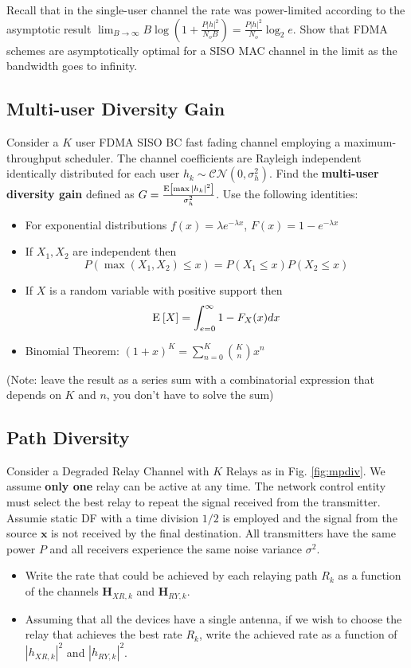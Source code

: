 \documentclass[a4paper,10pt]{article}
\newcommand{\Hb}{\mathbf{H}}
\newcommand{\x}{\mathbf{x}}
\newcommand{\Ex}[2]{{\textnormal{E}_{#1}\left[#2\right]}}
\begin{document}
Recall that in the single-user channel the rate was power-limited according to the asymptotic result $\lim_{B\to\infty}B\log(1+\frac{P|h|^2}{N_oB})=\frac{P|h|^2}{N_o}\log_2e$. Show that FDMA schemes are asymptotically optimal for a SISO MAC channel in the limit as the bandwidth goes to infinity.

\subsection{Multi-user Diversity Gain}

Consider a $K$ user FDMA SISO BC fast fading channel employing a maximum-throughput scheduler. The channel coefficients are Rayleigh independent identically distributed for each user $h_k\sim \mathcal{CN}(0,\sigma_h^2)$. Find the \textbf{multi-user diversity gain} defined as $G=\frac{\Ex{}{\max |h_k|^2}}{\sigma_h^2}$. Use the following identities:
\begin{itemize}
 \item For exponential distributions $f(x)=\lambda e^{-\lambda x}$, $F(x)=1-e^{-\lambda x}$
 \item If $X_1,X_2$ are independent then
 $$P(\max(X_1,X_2)\leq x)=P(X_1\leq x)P(X_2\leq x)$$
 \item If $X$ is a random variable with positive support then
 $$\Ex{}{X}=\int_{e=0}^{\infty} 1-F_{X}(x)dx$$
 \item Binomial Theorem: $(1+x)^K=\sum_{n=0}^{K}{K \choose n}x^{n}$
\end{itemize}
(Note: leave the result as a series sum with a combinatorial expression that depends on $K$ and $n$, you don't have to solve the sum)

\subsection{Path Diversity}

Consider a Degraded Relay Channel with $K$ Relays as in Fig. \ref{fig:mpdiv}. We assume \textbf{only one} relay can be active at any time. The network control entity must select the best relay to repeat the signal received from the transmitter. Assumie static DF with a time division $1/2$ is employed and the signal from the source $\x$ is not received by the final destination. All transmitters have the same power $P$ and all receivers experience the same noise variance $\sigma^2$.

\begin{itemize}
 \item Write the rate that could be achieved by each relaying path $R_k$ as a function of the channels $\Hb_{XR,k}$ and $\Hb_{RY,k}$.
 \item Assuming that all the devices have a single antenna, if we wish to choose the relay that achieves the best rate $R_k$, write the achieved rate as a function of $|h_{XR,k}|^2$ and $|h_{RY,k}|^2$.
\end{itemize}
\end{document}

